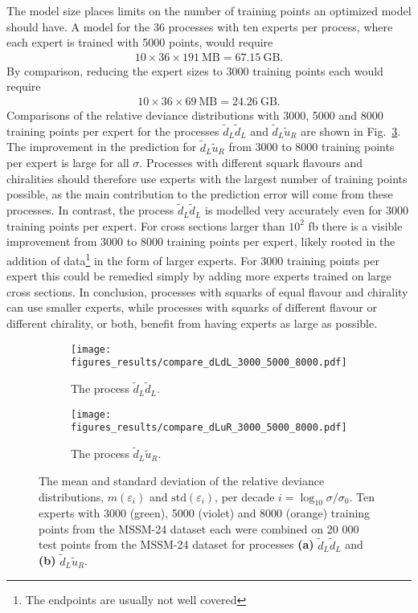 \documentclass[twoside,english]{uiofysmaster}
\begin{document}
{The model size places limits on the number of training points an optimized model should have. A model for the 36 processes with ten experts per process, where each expert is trained with 5000 points, would require
\begin{align}
10 \times 36 \times 191~\mathrm{MB} = 67.15~\mathrm{GB}. \nonumber
\end{align}
By comparison, reducing the expert sizes to 3000 training points each would require
\begin{align}
10 \times 36 \times 69~\mathrm{MB} = 24.26~\mathrm{GB}. \nonumber
\end{align}
Comparisons of the relative deviance distributions with 3000, 5000 and 8000 training points per expert for the processes $\widetilde{d}_L \widetilde{d}_L$ and $\widetilde{d}_L \widetilde{u}_R$ are shown in Fig.~\ref{Fig:: results : RD 3000 vs 5000}. The improvement in the prediction for $\widetilde{d}_L \widetilde{u}_R$ from 3000 to 8000 training points per expert is large for all $\sigma$. Processes with different squark flavours and chiralities should therefore use experts with the largest number of training points possible, as the main contribution to the prediction error will come from these processes. In contrast, the process $\widetilde{d}_L \widetilde{d}_L$ is modelled very accurately even for 3000 training points per expert. For cross sections larger than $10^2$ fb there is a visible improvement from 3000 to 8000 training points per expert, likely rooted in the addition of data\footnote{The endpoints are usually not well covered} in the form of larger experts. For 3000 training points per expert this could be remedied simply by adding more experts trained on large cross sections. In conclusion, processes with squarks of equal flavour and chirality can use smaller experts, while processes with squarks of different flavour or different chirality, or both, benefit from having experts as large as possible.


\begin{figure}
    \centering
    \begin{subfigure}[b]{0.9\textwidth}
        \texttt{[image: figures\_results/compare\_dLdL\_3000\_5000\_8000.pdf]}
        \caption{The process $\widetilde{d}_L \widetilde{d}_L$.}
        \label{Fig:: results : RD MSSM-24 uLuL experts}
    \end{subfigure}
    \begin{subfigure}[b]{0.9\textwidth}
        \texttt{[image: figures\_results/compare\_dLuR\_3000\_5000\_8000.pdf]}
        \caption{The process $\widetilde{d}_L\widetilde{u}_R$.}
        \label{Fig :: results : RD MSSM-24 uLdL experts}
    \end{subfigure}
    \caption{The mean and standard deviation of the relative deviance distributions, $m(\varepsilon_i)$ and $\mathrm{std}(\varepsilon_i)$, per decade $i =\log_{10} \sigma / \sigma_0$. Ten experts with 3000 (green), 5000 (violet) and 8000 (orange) training points from the MSSM-24 dataset each were combined on 20 000 test points from the MSSM-24 dataset for processes \textbf{(a)}  $\widetilde{d}_L \widetilde{d}_L$ and \textbf{(b)} $\widetilde{d}_L\widetilde{u}_R$. }
\label{Fig:: results : RD 3000 vs 5000}
\end{figure}

}
\end{document}
